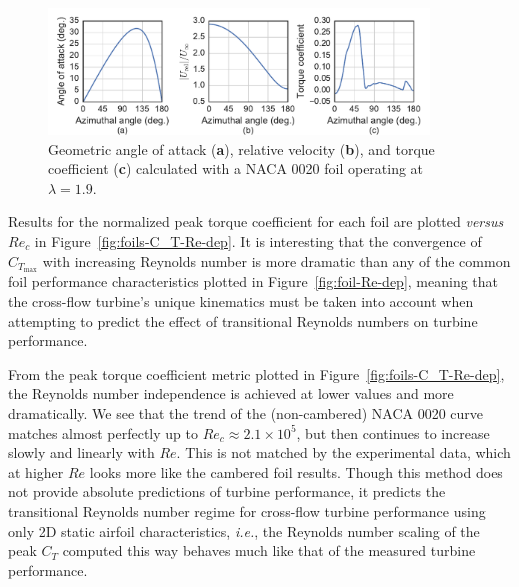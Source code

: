 \documentclass[energies,article,accept,moreauthors,pdftex,10pt,a4paper]{mdpi}
\theoremstyle{mdpi}
\newcounter{ex}
\newcounter{re}
\begin{document}
\begin{figure}[ht!]
    \centering

    \includegraphics[width=0.9\textwidth]{figures/foil_kinematics_ct}

    \caption{Geometric angle of attack (\textbf{a}), relative velocity
        (\textbf{b}),  and torque coefficient (\textbf{c}) calculated with a NACA
        0020 foil operating at $\lambda=1.9$.}

    \label{fig:blade-kinematics}
\end{figure}

Results for the normalized peak torque coefficient for each foil are plotted
\textit{versus} $Re_c$ in Figure~\ref{fig:foils-C_T-Re-dep}. It is interesting
that the convergence of $C_{T_\mathrm{max}}$ with increasing Reynolds number is
more dramatic than any of the common foil performance characteristics plotted in
Figure~\ref{fig:foil-Re-dep}, meaning that the cross-flow turbine's unique
kinematics must be taken into account when attempting to predict the effect of
transitional Reynolds numbers on turbine performance.

From the peak torque coefficient metric plotted in
Figure~\ref{fig:foils-C_T-Re-dep}, the Reynolds number independence is achieved
at lower values and more dramatically. We see that the trend of the
(non-cambered) NACA 0020 curve matches almost perfectly up to $Re_c \approx 2.1
\times 10^5$, but then continues to increase slowly and linearly with $Re$. This
is not matched by the experimental data, which at higher $Re$ looks more like
the cambered foil results. Though this method does not provide absolute
predictions of turbine performance, it predicts the transitional Reynolds number
regime for cross-flow turbine performance using only 2D static airfoil
characteristics, \emph{i.e.}, the Reynolds number scaling of the peak $C_T$
computed this way behaves much like that of the measured turbine performance.
\end{document}
